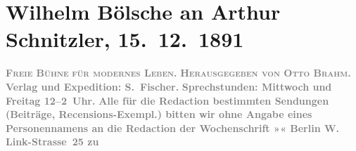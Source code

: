 

         
         \renewcommand{\erwaehntePersonen}{Personen: Otto Brahm}
         \renewcommand{\erwaehnteInstitutionen}{Institutionen: S. Fischer Verlag}
         \renewcommand{\erwaehnteOrte}{Orte: Berlin, Friedrichshagen, Linkstraße, Peter-Hille-Straße, Wien}
         \renewcommand{\erwaehnteWerke}{Werke: Der Sohn. Aus den Papieren eines Arztes, Freie Bühne für den Entwickelungskampf der Zeit, Freie Bühne für modernes Leben}
               \section[Wilhelm Bölsche an Arthur Schnitzler, 15. 12. 1891]{ Wilhelm Bölsche an Arthur Schnitzler, 15. 12. 1891}\nopagebreak{}\rehead{ }\begin{ledgroupsized}[t]{13cm}\normalsize\beginnumbering \toendnotes[C]{\smallbreak\pagebreak[2]} 
\toendnotes[C]{\smallbreak}\pstart
           \noindent{}\centering{}{\pb}\textcolor{gray}{\textbf{\textsc{Freie Bühne}}}\pend
           \pstart
           \noindent{}\centering{}\textcolor{gray}{\textbf{\textsc{für modernes Leben.}}}\pend
           \pstart
           \noindent{}\centering{}\textcolor{gray}{\textbf{\textsc{Herausgegeben von \textbf{Otto Brahm}.}}}\pend
           \pstart
           \noindent{}\textcolor{gray}{\textbf{Verlag und Expedition: S. Fischer.}}\pend
           \pstart
           \textcolor{gray}{\textbf{Sprechstunden: Mittwoch und Freitag 12–2 Uhr.}}\pend
           \pstart
           \textcolor{gray}{\textbf{Alle für die Redaction bestimmten Sendungen (Beiträge,
                            Recensions-Exempl.) bitten wir \textbf{ohne Angabe eines
                                Personennamens} an die Redaction der Wochenschrift »« Berlin W. Link-Strasse 25 zu
}}
\end{ledgroupsized}

